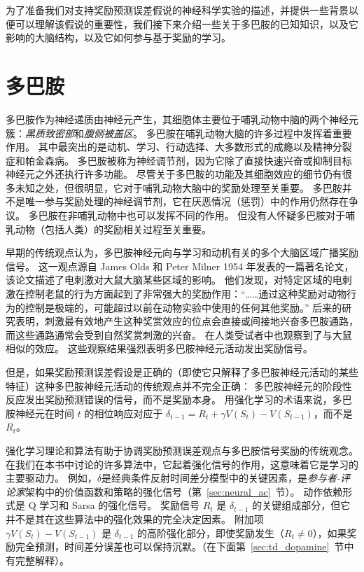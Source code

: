 为了准备我们对支持奖励预测误差假说的神经科学实验的描述，并提供一些背景以便可以理解该假说的重要性，我们接下来介绍一些关于多巴胺的已知知识，以及它影响的大脑结构，以及它如何参与基于奖励的学习。


\section{多巴胺}

多巴胺作为神经递质由神经元产生，其细胞体主要位于哺乳动物中脑的两个神经元簇：\textit{黑质致密部}和\textit{腹侧被盖区}。
多巴胺在哺乳动物大脑的许多过程中发挥着重要作用。
其中最突出的是动机、学习、行动选择、大多数形式的成瘾以及精神分裂症和帕金森病。
多巴胺被称为神经调节剂，因为它除了直接快速兴奋或抑制目标神经元之外还执行许多功能。
尽管关于多巴胺的功能及其细胞效应的细节仍有很多未知之处，但很明显，它对于哺乳动物大脑中的奖励处理至关重要。
多巴胺并不是唯一参与奖励处理的神经调节剂，它在厌恶情况（惩罚）中的作用仍然存在争议。
多巴胺在非哺乳动物中也可以发挥不同的作用。
但没有人怀疑多巴胺对于哺乳动物（包括人类）的奖励相关过程至关重要。


早期的传统观点认为，多巴胺神经元向与学习和动机有关的多个大脑区域广播奖励信号。
这一观点源自 James Olds 和 Peter Milner 1954 年发表的一篇著名论文，该论文描述了电刺激对大鼠大脑某些区域的影响。
他们发现，对特定区域的电刺激在控制老鼠的行为方面起到了非常强大的奖励作用：“……通过这种奖励对动物行为的控制是极端的，可能超过以前在动物实验中使用的任何其他奖励。”\cite{olds1954positive}
后来的研究表明，刺激最有效地产生这种奖赏效应的位点会直接或间接地兴奋多巴胺通路，而这些通路通常会受到自然奖赏刺激的兴奋。
在人类受试者中也观察到了与大鼠相似的效应。
这些观察结果强烈表明多巴胺神经元活动发出奖励信号。


但是，如果奖励预测误差假设是正确的（即使它只解释了多巴胺神经元活动的某些特征）这种多巴胺神经元活动的传统观点并不完全正确：
多巴胺神经元的阶段性反应发出奖励预测错误的信号，而不是奖励本身。
用强化学习的术语来说，多巴胺神经元在时间 $ t $ 的相位响应对应于 $ \delta_{t-1} = R_t + \gamma V(S_t) - V(S_{t-1}) $，而不是 $ R_t $。


强化学习理论和算法有助于协调奖励预测误差观点与多巴胺信号奖励的传统观念。
在我们在本书中讨论的许多算法中，它起着强化信号的作用，这意味着它是学习的主要驱动力。
例如，$ \delta $是经典条件反射时间差分模型中的关键因素，是\textit{参与者-评论家}架构中的价值函数和策略的强化信号（第~\ref{sec:neural_ac}~节）。
动作依赖形式是 Q 学习和 Sarsa 的强化信号。
奖励信号 $ R_t $ 是 $ \delta_{t-1} $ 的关键组成部分，但它并不是其在这些算法中的强化效果的完全决定因素。
附加项 $ \gamma V(S_t) - V(S_{t-1}) $ 是 $ \delta_{t-1} $ 的高阶强化部分，即使奖励发生（$ R_t \neq 0 $），如果奖励完全预测，时间差分误差也可以保持沉默。（在下面第~\ref{sec:td_dopamine}~节中有完整解释）。


